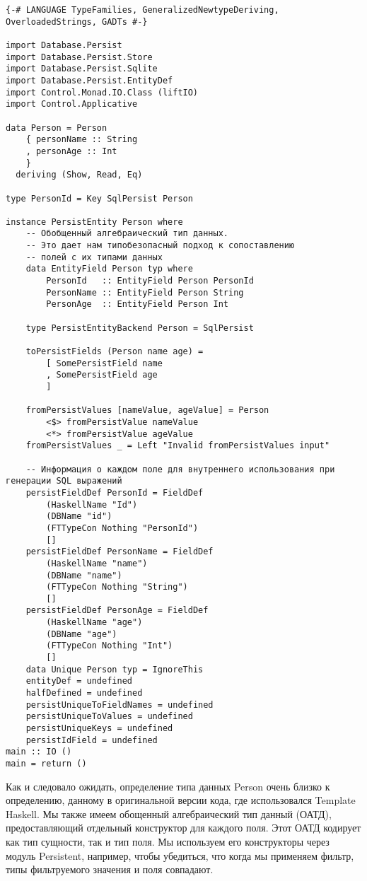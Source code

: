 \begin{lstlisting}
{-# LANGUAGE TypeFamilies, GeneralizedNewtypeDeriving, OverloadedStrings, GADTs #-}

import Database.Persist
import Database.Persist.Store
import Database.Persist.Sqlite
import Database.Persist.EntityDef
import Control.Monad.IO.Class (liftIO)
import Control.Applicative

data Person = Person
    { personName :: String
    , personAge :: Int
    }
  deriving (Show, Read, Eq)

type PersonId = Key SqlPersist Person

instance PersistEntity Person where
    -- Обобщенный алгебраический тип данных.
    -- Это дает нам типобезопасный подход к сопоставлению
    -- полей с их типами данных
    data EntityField Person typ where
        PersonId   :: EntityField Person PersonId
        PersonName :: EntityField Person String
        PersonAge  :: EntityField Person Int

    type PersistEntityBackend Person = SqlPersist

    toPersistFields (Person name age) =
        [ SomePersistField name
        , SomePersistField age
        ]

    fromPersistValues [nameValue, ageValue] = Person
        <$> fromPersistValue nameValue
        <*> fromPersistValue ageValue
    fromPersistValues _ = Left "Invalid fromPersistValues input"

    -- Информация о каждом поле для внутреннего использования при генерации SQL выражений
    persistFieldDef PersonId = FieldDef
        (HaskellName "Id")
        (DBName "id")
        (FTTypeCon Nothing "PersonId")
        []
    persistFieldDef PersonName = FieldDef
        (HaskellName "name")
        (DBName "name")
        (FTTypeCon Nothing "String")
        []
    persistFieldDef PersonAge = FieldDef
        (HaskellName "age")
        (DBName "age")
        (FTTypeCon Nothing "Int")
        []
    data Unique Person typ = IgnoreThis
    entityDef = undefined
    halfDefined = undefined
    persistUniqueToFieldNames = undefined
    persistUniqueToValues = undefined
    persistUniqueKeys = undefined
    persistIdField = undefined
main :: IO ()
main = return ()
\end{lstlisting}%

Как и следовало ожидать, определение типа данных Person очень близко к определению, данному в оригинальной версии кода, где использовался Template Haskell. Мы также имеем обощенный алгебраический тип данный (ОАТД), предоставляющий отдельный конструктор для каждого поля. Этот ОАТД кодирует как тип сущности, так и тип поля. Мы используем его конструкторы через модуль Persistent, например, чтобы убедиться, что когда мы применяем фильтр, типы фильтруемого значения и поля совпадают.

